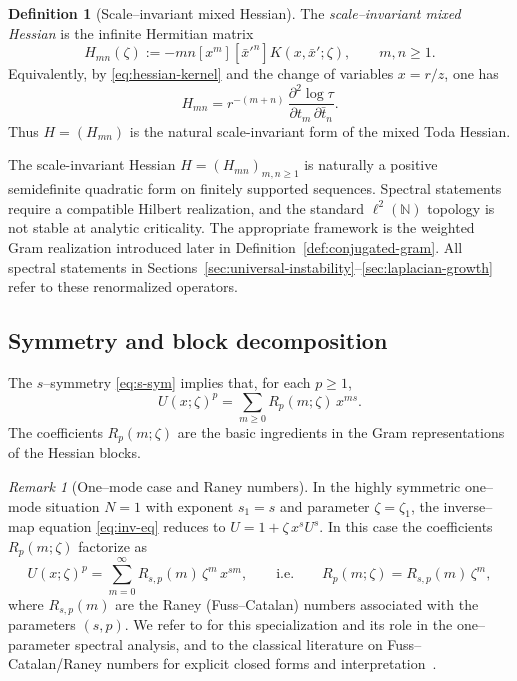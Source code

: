 \documentclass[11pt]{amsart}
\numberwithin{equation}{section}
\theoremstyle{plain}
\theoremstyle{definition}
\newtheorem{definition}[theorem]{Definition}
\theoremstyle{remark}
\newtheorem{remark}[theorem]{Remark}
\newcommand{\N}{\mathbb{N}}
\begin{document}
\begin{definition}[Scale--invariant mixed Hessian]\label{def:scale-inv-hessian}
	The \emph{scale--invariant mixed Hessian} is the infinite Hermitian matrix
	\begin{equation}\label{eq:H-rescaled}
		H_{mn}(\zeta):=-mn [x^m][\bar x'^n] K(x,\bar x';\zeta),
		\qquad m,n\ge1.
	\end{equation}
	Equivalently, by \eqref{eq:hessian-kernel} and the change of variables $x=r/z$, one has
	\begin{equation}\label{eq:H-vs-tau}
		H_{mn}
		=
		r^{-(m+n)}\,
		\frac{\partial^2\log\tau}{\partial t_m\,\partial\bar t_n}.
	\end{equation}
	Thus $H=(H_{mn})$ is the natural scale-invariant form of the mixed Toda Hessian.
\end{definition}

	The scale-invariant Hessian $H=(H_{mn})_{m,n\ge1}$ is naturally a positive semidefinite
	quadratic form on finitely supported sequences. Spectral statements require a compatible Hilbert
	realization, and the standard $\ell^2(\N)$ topology is not stable at analytic criticality. The
	appropriate framework is the weighted Gram realization introduced later in
	Definition~\ref{def:conjugated-gram}. All spectral statements in
	Sections~\ref{sec:universal-instability}--\ref{sec:laplacian-growth} refer to these renormalized operators.


\subsection{Symmetry and block decomposition}
The $s$--symmetry \eqref{eq:s-sym} implies that, for each $p\ge1$,
\begin{equation}\label{eq:Sp-expansion}
	U(x;\zeta)^p=\sum_{m\ge0} R_p(m;\zeta)\,x^{ms}.
\end{equation}
The coefficients $R_p(m;\zeta)$ are the basic ingredients in the Gram representations of the Hessian
blocks.

\begin{remark}[One--mode case and Raney numbers]\label{rem:raney-one-mode}
	In the highly symmetric one--mode situation $N=1$ with exponent $s_1=s$ and parameter $\zeta=\zeta_1$,
	the inverse--map equation \eqref{eq:inv-eq} reduces to $U=1+\zeta\,x^{s}U^{s}$. In this case the
	coefficients $R_p(m;\zeta)$ factorize as
	\begin{equation}\label{eq:Rp-raney}
		U(x;\zeta)^p=\sum_{m=0}^{\infty} R_{s,p}(m)\,\zeta^{m}\,x^{sm},
		\qquad\text{i.e.}\qquad
		R_p(m;\zeta)=R_{s,p}(m)\,\zeta^{m},
	\end{equation}
	where $R_{s,p}(m)$ are the Raney (Fuss--Catalan) numbers associated with the parameters $(s,p)$.
	We refer to \cite{Alekseev2025-1} for this specialization and its role in the one--parameter spectral
	analysis, and to the classical literature on Fuss--Catalan/Raney numbers for explicit closed forms and interpretation~\cite{Raney1960,GrahamKnuthPatashnik1994}.
\end{remark}
\end{document}
